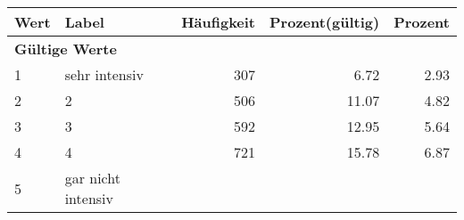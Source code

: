      \begin{longtable}{lXrrr}
     \toprule
     \textbf{Wert} & \textbf{Label} & \textbf{Häufigkeit} & \textbf{Prozent(gültig)} & \textbf{Prozent} \\
     \endhead
     \midrule
     \multicolumn{5}{l}{\textbf{Gültige Werte}}\\

     1 &
     \multicolumn{1}{X}{ sehr intensiv   } &


       \num{307} &
       \num[round-mode=places,round-precision=2]{6.72} &
         \num[round-mode=places,round-precision=2]{2.93} \\

     2 &
     \multicolumn{1}{X}{ 2   } &


       \num{506} &
       \num[round-mode=places,round-precision=2]{11.07} &
         \num[round-mode=places,round-precision=2]{4.82} \\

     3 &
     \multicolumn{1}{X}{ 3   } &


       \num{592} &
       \num[round-mode=places,round-precision=2]{12.95} &
         \num[round-mode=places,round-precision=2]{5.64} \\

     4 &
     \multicolumn{1}{X}{ 4   } &


       \num{721} &
       \num[round-mode=places,round-precision=2]{15.78} &
         \num[round-mode=places,round-precision=2]{6.87} \\

     5 &
     \multicolumn{1}{X}{ gar nicht intensiv   } &



\end{longtable}
